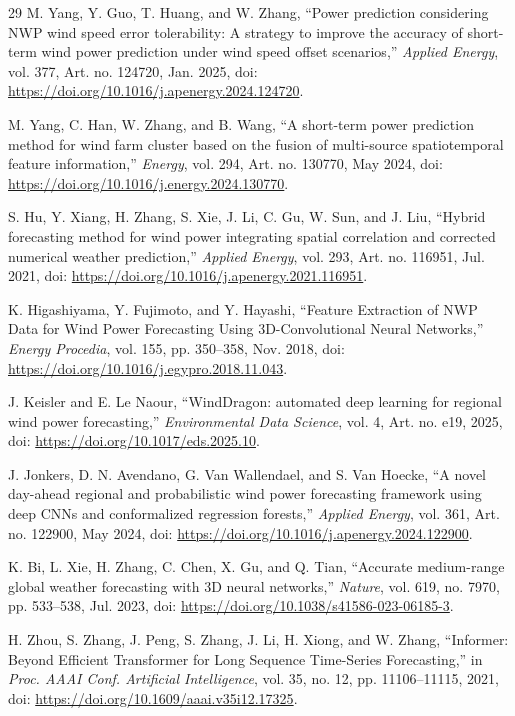 \begin{thebibliography}{29}
M. Yang, Y. Guo, T. Huang, and W. Zhang, ``Power prediction considering NWP wind speed error tolerability: A strategy to improve the accuracy of short-term wind power prediction under wind speed offset scenarios,'' \textit{Applied Energy}, vol. 377, Art. no. 124720, Jan. 2025, doi: \url{https://doi.org/10.1016/j.apenergy.2024.124720}.

M. Yang, C. Han, W. Zhang, and B. Wang, ``A short-term power prediction method for wind farm cluster based on the fusion of multi-source spatiotemporal feature information,'' \textit{Energy}, vol. 294, Art. no. 130770, May 2024, doi: \url{https://doi.org/10.1016/j.energy.2024.130770}.

S. Hu, Y. Xiang, H. Zhang, S. Xie, J. Li, C. Gu, W. Sun, and J. Liu, ``Hybrid forecasting method for wind power integrating spatial correlation and corrected numerical weather prediction,'' \textit{Applied Energy}, vol. 293, Art. no. 116951, Jul. 2021, doi: \url{https://doi.org/10.1016/j.apenergy.2021.116951}.

K. Higashiyama, Y. Fujimoto, and Y. Hayashi, ``Feature Extraction of NWP Data for Wind Power Forecasting Using 3D-Convolutional Neural Networks,'' \textit{Energy Procedia}, vol. 155, pp. 350--358, Nov. 2018, doi: \url{https://doi.org/10.1016/j.egypro.2018.11.043}.

J. Keisler and E. Le Naour, ``WindDragon: automated deep learning for regional wind power forecasting,'' \textit{Environmental Data Science}, vol. 4, Art. no. e19, 2025, doi: \url{https://doi.org/10.1017/eds.2025.10}.

J. Jonkers, D. N. Avendano, G. Van Wallendael, and S. Van Hoecke, ``A novel day-ahead regional and probabilistic wind power forecasting framework using deep CNNs and conformalized regression forests,'' \textit{Applied Energy}, vol. 361, Art. no. 122900, May 2024, doi: \url{https://doi.org/10.1016/j.apenergy.2024.122900}.

K. Bi, L. Xie, H. Zhang, C. Chen, X. Gu, and Q. Tian, ``Accurate medium-range global weather forecasting with 3D neural networks,'' \textit{Nature}, vol. 619, no. 7970, pp. 533--538, Jul. 2023, doi: \url{https://doi.org/10.1038/s41586-023-06185-3}.

H. Zhou, S. Zhang, J. Peng, S. Zhang, J. Li, H. Xiong, and W. Zhang, ``Informer: Beyond Efficient Transformer for Long Sequence Time-Series Forecasting,'' in \textit{Proc. AAAI Conf. Artificial Intelligence}, vol. 35, no. 12, pp. 11106--11115, 2021, doi: \url{https://doi.org/10.1609/aaai.v35i12.17325}.


\end{thebibliography}
